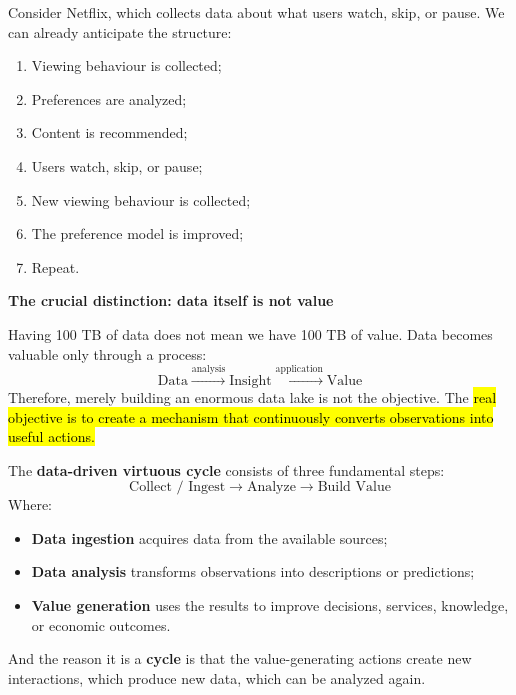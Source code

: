 \begin{examplebox}
    Consider Netflix, which collects data about what users watch, skip, or pause. We can already anticipate the structure:
    \begin{enumerate}
        \item Viewing behaviour is collected;
        \item Preferences are analyzed;
        \item Content is recommended;
        \item Users watch, skip, or pause;
        \item New viewing behaviour is collected;
        \item The preference model is improved;
        \item Repeat.
    \end{enumerate}
\end{examplebox}

\highspace
\begin{flushleft}
    \textcolor{Green3}{ \textbf{The crucial distinction: data itself is not value}}
\end{flushleft}
Having 100 TB of data does not mean we have 100 TB of value. Data becomes valuable only through a process:
\begin{equation*}
    \text{Data}
    \xrightarrow{\text{analysis}}
    \text{Insight}
    \xrightarrow{\text{application}}
    \text{Value}
\end{equation*}
Therefore, merely building an enormous data lake is not the objective. The \hl{real objective is to create a mechanism that continuously converts observations into useful actions.}

\highspace
\begin{takeawaysbox}
    The \textbf{data-driven virtuous cycle} consists of three fundamental steps:
    \begin{equation*}
        \text{Collect / Ingest}
        \rightarrow
        \text{Analyze}
        \rightarrow
        \text{Build Value}
    \end{equation*}
    Where:
    \begin{itemize}
        \item \textbf{Data ingestion} acquires data from the available sources;
        \item \textbf{Data analysis} transforms observations into descriptions or predictions;
        \item \textbf{Value generation} uses the results to improve decisions, services, knowledge, or economic outcomes.
    \end{itemize}
    And the reason it is a \textbf{cycle} is that the value-generating actions create new interactions, which produce new data, which can be analyzed again.
\end{takeawaysbox}